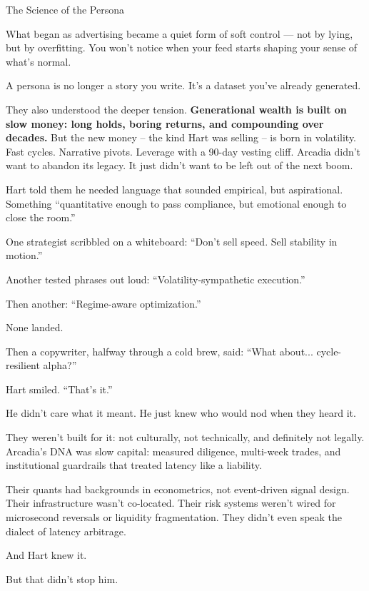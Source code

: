 \begin{HistoricalSidebar}{The Science of the Persona}
  \medskip
  
  What began as advertising became a quiet form of soft control — not by lying, but by overfitting.  
  You won’t notice when your feed starts shaping your sense of what’s normal.
  
  \medskip
  
  A persona is no longer a story you write.  
  It’s a dataset you’ve already generated.
  
\end{HistoricalSidebar}
  
\medskip

They also understood the deeper tension.
\textbf{Generational wealth is built on slow money: long holds, boring returns, and compounding over decades.}
But the new money -- the kind Hart was selling -- is born in volatility.
Fast cycles. Narrative pivots. Leverage with a 90-day vesting cliff.
Arcadia didn’t want to abandon its legacy.
It just didn’t want to be left out of the next boom.

Hart told them he needed language that sounded empirical, but aspirational.
Something ``quantitative enough to pass compliance, but emotional enough to close the room.''

One strategist scribbled on a whiteboard:
``Don’t sell speed. Sell stability in motion.''

Another tested phrases out loud: ``Volatility-sympathetic execution.''

Then another: ``Regime-aware optimization.''

None landed.

Then a copywriter, halfway through a cold brew, said:
``What about... cycle-resilient alpha?''

Hart smiled.
``That’s it.''

He didn’t care what it meant.
He just knew who would nod when they heard it.

They weren’t built for it: not culturally, not technically, and definitely not legally.
Arcadia’s DNA was slow capital: measured diligence, multi-week trades, and institutional guardrails that treated 
latency like a liability.

Their quants had backgrounds in econometrics, not event-driven signal design.
Their infrastructure wasn’t co-located.
Their risk systems weren’t wired for microsecond reversals or liquidity fragmentation.
They didn’t even speak the dialect of latency arbitrage.

And Hart knew it.

But that didn’t stop him.



